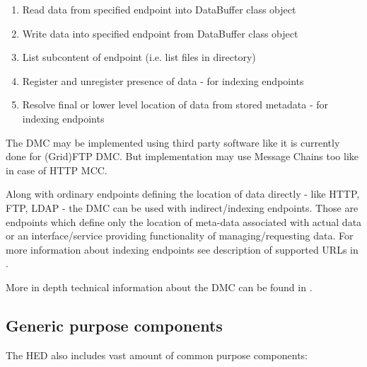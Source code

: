 \documentclass{book}
\begin{document}
\begin{enumerate}

\item Read data from specified endpoint into DataBuffer class object

\item Write data into specified endpoint from DataBuffer class object

\item List subcontent of endpoint (i.e. list files in directory)

\item Register and unregister presence of data - for indexing endpoints

\item Resolve final or lower level location of data from stored metadata - for indexing endpoints

\end{enumerate}

The DMC may be implemented using third party software like it is currently done for (Grid)FTP DMC. But implementation may use Message Chains too like in case of HTTP MCC.

Along with ordinary endpoints defining the location of data directly - like HTTP, FTP, LDAP - the DMC can be used with indirect/indexing endpoints. Those are endpoints which define only the location of meta-data associated with actual data or an interface/service providing functionality of managing/requesting data. For more information about indexing endpoints see description of supported URLs in \cite{urls}.

More in depth technical information about the DMC can be found in \cite{dmc}.


\subsection{Generic purpose components}

The HED also includes vast amount of common purpose components:
\end{document}
